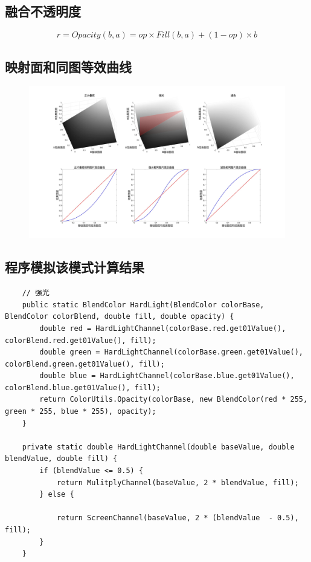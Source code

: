 \subsection{ 融合不透明度}
\begin{equation}
	r=Opacity(b,a)=op\times Fill(b,a)+(1-op)\times b
\end{equation}
\newpage
\subsection{ 映射面和同图等效曲线}
\begin{figure}[h!]
	\centering
	\includegraphics[width=\linewidth]{figure/强光}
	\caption{}
	\label{fig:}
\end{figure}



\subsection{ 程序模拟该模式计算结果}
\begin{lstlisting}
	// 强光
	public static BlendColor HardLight(BlendColor colorBase, BlendColor colorBlend, double fill, double opacity) {
		double red = HardLightChannel(colorBase.red.get01Value(), colorBlend.red.get01Value(), fill);
		double green = HardLightChannel(colorBase.green.get01Value(), colorBlend.green.get01Value(), fill);
		double blue = HardLightChannel(colorBase.blue.get01Value(), colorBlend.blue.get01Value(), fill);
		return ColorUtils.Opacity(colorBase, new BlendColor(red * 255, green * 255, blue * 255), opacity);
	}
	
	private static double HardLightChannel(double baseValue, double blendValue, double fill) {
		if (blendValue <= 0.5) {
			return MulitplyChannel(baseValue, 2 * blendValue, fill);
		} else {
			
			return ScreenChannel(baseValue, 2 * (blendValue  - 0.5), fill);
		}
	}
\end{lstlisting}

